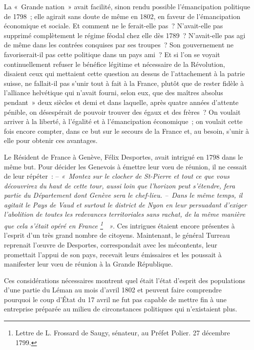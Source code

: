 \documentclass[french,twoside]{book} %
\newcommand\chapterclose{} %
\begin{document}
La « Grande nation » avait facilité, sinon rendu possible l’émancipation politique de 1798 ; elle agirait sans doute de même en 1802, en faveur de l’émancipation économique et sociale. Et comment ne le ferait-elle pas ? N’avait-elle pas supprimé complètement le régime féodal chez elle dès 1789 ? N’avait-elle pas agi de même dans les contrées conquises par ses troupes ? Son gouvernement ne favoriserait-il pas cette politique dans un pays ami ? Et si l’on se voyait continuellement refuser le bénéfice légitime et nécessaire de la Révolution, disaient ceux qui mettaient cette question au dessus de l’attachement à la patrie suisse, ne fallait-il pas s’unir tout à fait à la France, plutôt que de rester fidèle à l’alliance helvétique qui n’avait fourni, selon eux, que des maîtres absolus pendant » deux siècles et demi et dans laquelle, après quatre années d’attente pénible, on désespérait de pouvoir trouver des égaux et des frères ? On voulait arriver à la liberté, à l’égalité et à l’émancipation économique ; on voulait cette fois encore compter, dans ce but sur le secours de la France et, au besoin, s’unir à elle pour obtenir ces avantages.\par
Le Résident de France à Genève, Félix Desportes, avait intrigué en 1798 dans le même but. Pour décider les Genevois à émettre leur vœu de réunion, il ne cessait de leur répéter : – \emph{« Montez sur le clocher de St-Pierre et tout ce que vous découvrirez du haut de cette tour, aussi loin que l’horizon peut s’étendre, fera partie du Département dont Genève sera le chef-lieu. – Dans le même temps, il agitait le Pays de Vaud et surtout le district de Nyon en leur persuadant d’exiger l’abolition de toutes les redevances territoriales sans rachat, de la même manière que cela s’était opéré en France \footnote{Lettre de L. Frossard de Saugy, sénateur, au Préfet Polier. 27 décembre 1799.}  »}. Ces intrigues étaient encore présentes à l’esprit d’un très grand nombre de citoyens. Maintenant, le général Turreau reprenait l’œuvre de Desportes, correspondait avec les mécontents, leur promettait l’appui de son pays, recevait leurs émissaires et les poussait à manifester leur vœu de réunion à la Grande République.\par
Ces considérations nécessaires montrent quel était l’état d’esprit des populations d’une partie du Léman au mois d’avril 1802 et peuvent faire comprendre pourquoi le coup d’État du 17 avril ne fut pas capable de mettre fin à une entreprise préparée au milieu de circonstances politiques qui n’existaient plus.
\chapterclose
\end{document}
